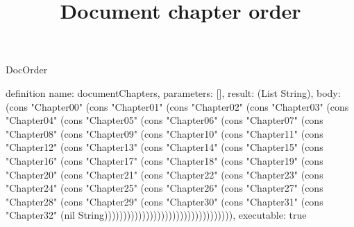 \begin{lexlean}{DocOrder}
\title{Document chapter order}
\begin{semanticmodule}
definition{
  name: documentChapters,
  parameters: [],
  result: (List String),
  body: (cons "Chapter00" (cons "Chapter01" (cons "Chapter02" (cons "Chapter03" (cons "Chapter04" (cons "Chapter05" (cons "Chapter06" (cons "Chapter07" (cons "Chapter08" (cons "Chapter09" (cons "Chapter10" (cons "Chapter11" (cons "Chapter12" (cons "Chapter13" (cons "Chapter14" (cons "Chapter15" (cons "Chapter16" (cons "Chapter17" (cons "Chapter18" (cons "Chapter19" (cons "Chapter20" (cons "Chapter21" (cons "Chapter22" (cons "Chapter23" (cons "Chapter24" (cons "Chapter25" (cons "Chapter26" (cons "Chapter27" (cons "Chapter28" (cons "Chapter29" (cons "Chapter30" (cons "Chapter31" (cons "Chapter32" (nil String)))))))))))))))))))))))))))))))))),
  executable: true
}
\end{semanticmodule}
\end{lexlean}
